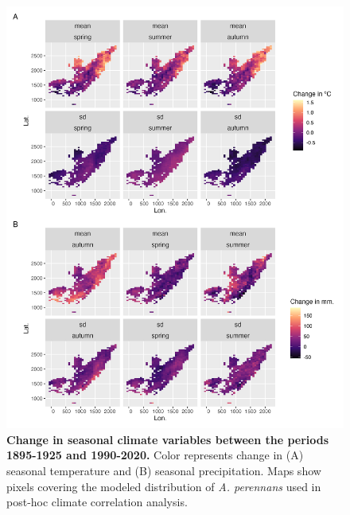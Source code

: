 \documentclass[11pt]{article}
\begin{document}
\begin{figure}[H]
	\centering
	\includegraphics[width = .8\linewidth]{../Plots/AGPE_climate_change_plot.png}
	\caption{\textbf{Change in seasonal climate variables between the periods 1895-1925 and 1990-2020.} Color represents change in (A) seasonal temperature and (B) seasonal precipitation. Maps show pixels covering the modeled distribution of \emph{A. perennans} used in post-hoc climate correlation analysis.}
	\label{fig:AGPE_climate_covariates}
\end{figure}
\end{document}
